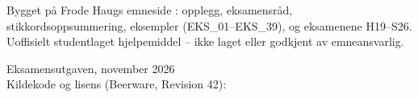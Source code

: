 \vfill
{\small Bygget på Frode Haugs emneside
\href{https://frh.folk.ntnu.no/grprog/}{}:
opplegg, eksamensråd, stikkordsoppsummering, eksempler (EKS\_01--EKS\_39),
 og eksamenene H19--S26. Uoffisielt studentlaget hjelpemiddel --
ikke laget eller godkjent av emneansvarlig.\par}
\vspace{0.3cm}
{\small\sffamily Eksamensutgaven, november 2026}\\[2pt]
{\small\sffamily Kildekode og lisens (Beerware, Revision 42):
 \href{https://github.com/mikkeliski/frode-bibelen}{}}
\clearpage
